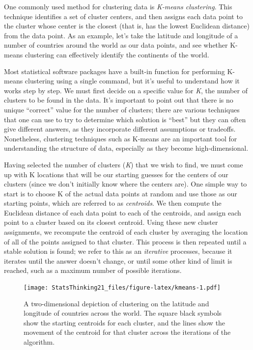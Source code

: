 \documentclass[
  12pt,
]{book}
\begin{document}
One commonly used method for clustering data is \emph{K-means clustering}. This technique identifies a set of cluster centers, and then assigns each data point to the cluster whose center is the closest (that is, has the lowest Euclidean distance) from the data point. As an example, let's take the latitude and longitude of a number of countries around the world as our data points, and see whether K-means clustering can effectively identify the continents of the world.

Most statistical software packages have a built-in function for performing K-means clustering using a single command, but it's useful to understand how it works step by step. We must first decide on a specific value for \emph{K}, the number of clusters to be found in the data. It's important to point out that there is no unique ``correct'' value for the number of clusters; there are various techniques that one can use to try to determine which solution is ``best'' but they can often give different answers, as they incorporate different assumptions or tradeoffs. Nonetheless, clustering techniques such as K-means are an important tool for understanding the structure of data, especially as they become high-dimensional.

Having selected the number of clusters (\emph{K}) that we wish to find, we must come up with K locations that will be our starting guesses for the centers of our clusters (since we don't initially know where the centers are). One simple way to start is to choose K of the actual data points at random and use those as our starting points, which are referred to as \emph{centroids}. We then compute the Euclidean distance of each data point to each of the centroids, and assign each point to a cluster based on its closest centroid. Using these new cluster assignments, we recompute the centroid of each cluster by averaging the location of all of the points assigned to that cluster. This process is then repeated until a stable solution is found; we refer to this as an \emph{iterative} processes, because it iterates until the answer doesn't change, or until some other kind of limit is reached, such as a maximum number of possible iterations.

\begin{figure}
\centering
\texttt{[image: StatsThinking21\_files/figure-latex/kmeans-1.pdf]}
\caption{\label{fig:kmeans}A two-dimensional depiction of clustering on the latitude and longitude of countries across the world. The square black symbols show the starting centroids for each cluster, and the lines show the movement of the centroid for that cluster across the iterations of the algorithm.}
\end{figure}
\end{document}
